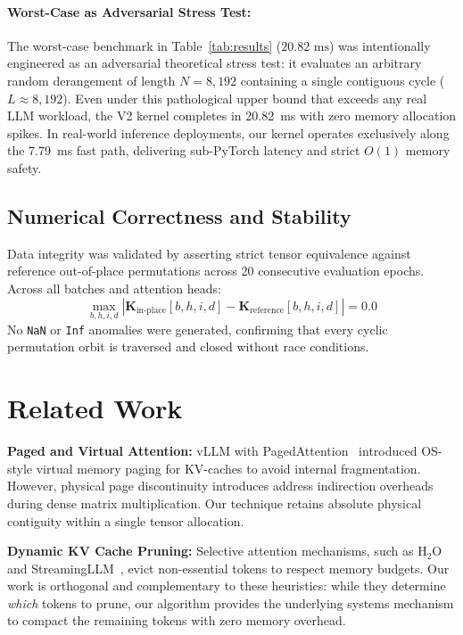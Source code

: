\documentclass[journal,10pt,twocolumn]{article}
\begin{document}
\paragraph{Worst-Case as Adversarial Stress Test:}
The worst-case benchmark in Table~\ref{tab:results} ($20.82\text{ ms}$) was intentionally engineered as an adversarial theoretical stress test: it evaluates an arbitrary random derangement of length $N = 8,192$ containing a single contiguous cycle ($L \approx 8,192$). Even under this pathological upper bound that exceeds any real LLM workload, the V2 kernel completes in 20.82~ms with zero memory allocation spikes. In real-world inference deployments, our kernel operates exclusively along the 7.79~ms fast path, delivering sub-PyTorch latency and strict $O(1)$ memory safety.

\subsection{Numerical Correctness and Stability}
Data integrity was validated by asserting strict tensor equivalence against reference out-of-place permutations across 20 consecutive evaluation epochs. Across all batches and attention heads:
\begin{equation}
    \max_{b,h,i,d} |\mathbf{K}_{\text{in-place}}[b,h,i,d] - \mathbf{K}_{\text{reference}}[b,h,i,d]| = 0.0
\end{equation}
No \texttt{NaN} or \texttt{Inf} anomalies were generated, confirming that every cyclic permutation orbit is traversed and closed without race conditions.

\section{Related Work}
\label{sec:related}
\textbf{Paged and Virtual Attention:} vLLM with PagedAttention~\cite{kwon2023efficient} introduced OS-style virtual memory paging for KV-caches to avoid internal fragmentation. However, physical page discontinuity introduces address indirection overheads during dense matrix multiplication. Our technique retains absolute physical contiguity within a single tensor allocation.

\textbf{Dynamic KV Cache Pruning:} Selective attention mechanisms, such as $\text{H}_2\text{O}$~\cite{zhang2023h2o} and StreamingLLM~\cite{xiao2023efficient}, evict non-essential tokens to respect memory budgets. Our work is orthogonal and complementary to these heuristics: while they determine \textit{which} tokens to prune, our algorithm provides the underlying systems mechanism to compact the remaining tokens with zero memory overhead.
\end{document}
